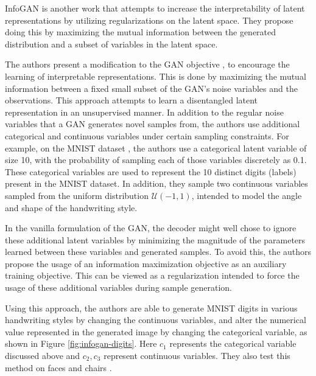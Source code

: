 InfoGAN \citep{chen2016infogan} is another work that attempts to increase the interpretability of latent representations by utilizing regularizations on the latent space. They propose doing this by maximizing the mutual information between the generated distribution and a subset of variables in the latent space.

The authors present a modification to the GAN objective \citep{goodfellow2014generative}, to encourage the learning of interpretable representations. This is done by maximizing the
mutual information between a fixed small subset of the GAN's noise variables and the observations. This approach attempts to learn a disentangled latent representation in an unsupervised manner. In addition to the regular noise variables that a GAN generates novel samples from, the authors use additional categorical and continuous variables under certain sampling constraints. For example, on the MNIST dataset \citep{lecun2010mnist}, the authors use a categorical latent variable of size 10, with the probability of sampling each of those variables discretely as 0.1. These categorical variables are used to represent the 10 distinct digits (labels) present in the MNIST dataset. In addition, they sample two continuous variables sampled from the uniform distribution $\mathcal{U}(-1, 1)$, intended to model the angle and shape of the handwriting style.

In the vanilla formulation of the GAN, the decoder might well chose to ignore these additional latent variables by minimizing the magnitude of the parameters learned between these variables and generated samples. To avoid this, the authors propose the usage of an information maximization objective as an auxiliary training objective. This can be viewed as a regularization intended to force the usage of these additional variables during sample generation.

Using this approach, the authors are able to generate MNIST digits in various handwriting styles by changing the continuous variables, and alter the numerical value represented in the generated image by changing the categorical variable, as shown in Figure \ref{fig:infogan-digits}. Here $c_1$ represents the categorical variable discussed above and $c_2, c_3$ represent continuous variables. They also test this method on faces \citep{liu2015deep,paysan20093d} and chairs \citep{aubry2014seeing}.

